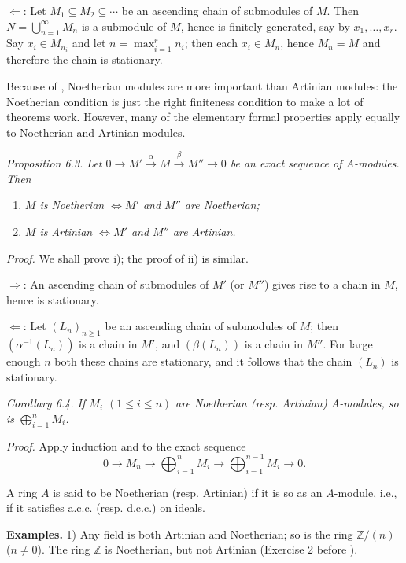 $\Leftarrow$: Let $M_1\subseteq M_2\subseteq\cdots$ be an ascending chain of submodules of $M$. Then $N=\bigcup_{n=1}^{\infty}M_n$ is a submodule of $M$, hence is finitely generated, say by $x_1,\ldots,x_r$. Say $x_i\in M_{n_i}$ and let $n=\max_{i=1}^r n_i$; then each $x_i\in M_n$, hence $M_n=M$ and therefore the chain is stationary. \proofbox

Because of , Noetherian modules are more important than Artinian modules: the Noetherian condition is just the right finiteness condition to make a lot of theorems work. However, many of the elementary formal properties apply equally to Noetherian and Artinian modules.

\noindent\textit{Proposition 6.3. Let $0\longrightarrow M'\xrightarrow{\alpha}M\xrightarrow{\beta}M''\longrightarrow0$ be an exact sequence of $A$-modules. Then}
\begin{enumerate}
\renewcommand{\labelenumi}{\roman{enumi})}
\item \textit{$M$ is Noetherian $\Longleftrightarrow M'$ and $M''$ are Noetherian;}
\item \textit{$M$ is Artinian $\Longleftrightarrow M'$ and $M''$ are Artinian.}
\end{enumerate}

\noindent\textit{Proof.} We shall prove i); the proof of ii) is similar.

$\Rightarrow$: An ascending chain of submodules of $M'$ (or $M''$) gives rise to a chain in $M$, hence is stationary.

$\Leftarrow$: Let $(L_n)_{n\geq1}$ be an ascending chain of submodules of $M$; then $(\alpha^{-1}(L_n))$ is a chain in $M'$, and $(\beta(L_n))$ is a chain in $M''$. For large enough $n$ both these chains are stationary, and it follows that the chain $(L_n)$ is stationary. \proofbox

\noindent\textit{Corollary 6.4. If $M_i$ $(1\leq i\leq n)$ are Noetherian (resp. Artinian) $A$-modules, so is $\bigoplus_{i=1}^nM_i$.}

\noindent\textit{Proof.} Apply induction and  to the exact sequence
\[
 0\longrightarrow M_n\longrightarrow\bigoplus_{i=1}^nM_i\longrightarrow\bigoplus_{i=1}^{n-1}M_i\longrightarrow0.
\]
\proofbox

A ring $A$ is said to be Noetherian (resp. Artinian) if it is so as an $A$-module, i.e., if it satisfies a.c.c. (resp. d.c.c.) on ideals.

\noindent\textbf{Examples.} 1) Any field is both Artinian and Noetherian; so is the ring $\mathbb Z/(n)$ ($n\neq0$). The ring $\mathbb Z$ is Noetherian, but not Artinian (Exercise 2 before ).

